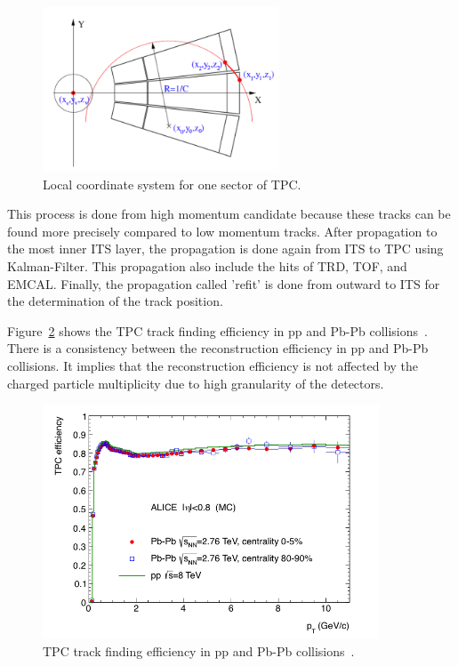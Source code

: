 \begin{figure}[!h]
  \centering
  \includegraphics[width=7cm]{chap3/figure/TrackReconstruction/TPCLocalCoodinate.png}
  \caption{Local coordinate system for one sector of TPC.}
  \label{fig_3_tpclocalcood}
\end{figure}
This process is done from high momentum candidate because these tracks can be found more precisely compared to low momentum tracks. 
After propagation to the most inner ITS layer, the propagation is done again from ITS to TPC using Kalman-Filter. 
This propagation also include the hits of TRD, TOF, and EMCAL. 
Finally, the propagation called 'refit' is done from outward to ITS for the determination of the track position. 



Figure~\ref{fig_3_trackeff} shows the TPC track finding efficiency in pp and Pb-Pb collisions~\cite{bib_aprrun1}. 
There is a consistency between the reconstruction efficiency in pp and Pb-Pb collisions. 
It implies that the reconstruction efficiency is not affected by the charged particle multiplicity due to high granularity of the detectors.  
\begin{figure}[!h]
  \centering
  \includegraphics[width=10cm]{chap3/figure/TrackReconstruction/TrackEff.png}
  \caption{TPC track finding efficiency in pp and Pb-Pb collisions~\cite{bib_aprrun1}.}
  \label{fig_3_trackeff}
\end{figure}

